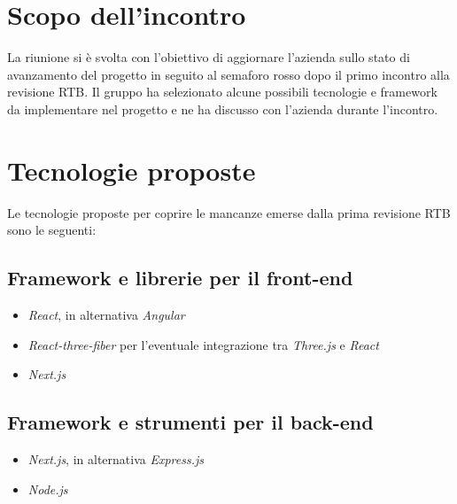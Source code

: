 \section{Scopo dell'incontro} \label{sec:scopo}
La riunione si è svolta con l'obiettivo di aggiornare l'azienda \nomeAzienda \space sullo stato di avanzamento del progetto in seguito al semaforo rosso dopo il primo incontro alla revisione RTB. Il gruppo ha selezionato alcune possibili tecnologie e framework da implementare nel progetto e ne ha discusso con l'azienda durante l'incontro.

\section{Tecnologie proposte} \label{sec:argomenti}
\noindent Le tecnologie proposte per coprire le mancanze emerse dalla prima revisione RTB sono le seguenti:
\subsection{Framework e librerie per il front-end}
\begin{itemize}
    \item \textit{React}, in alternativa \textit{Angular}
    \item \textit{React-three-fiber} per l'eventuale integrazione tra \textit{Three.js} e \textit{React}
    \item \textit{Next.js}
\end{itemize}
\subsection{Framework e strumenti per il back-end}
\begin{itemize}
    \item \textit{Next.js}, in alternativa \textit{Express.js}
    \item \textit{Node.js}
\end{itemize}


